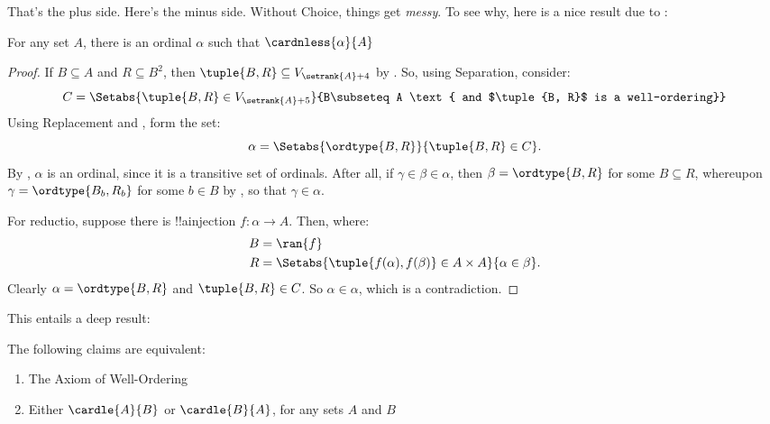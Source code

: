 \documentclass[../../../include/open-logic-section]{subfiles}
\begin{document}

That's the plus side. Here's the minus side. Without Choice, things
get \emph{messy}. To see why, here is a nice result due to
\cite{Hartogs1915}:

\begin{lem}[\emph{in $\ZF$}]
For any set $A$, there is an ordinal $\alpha$ such that $\cardnless{\alpha}{A}$
\end{lem}

\begin{proof}
If $B \subseteq A$ and $R \subseteq B^2$, then $\tuple{B, R} \subseteq
V_{\setrank{A}+4}$ by
. So, using
Separation, consider:
\[
	C = \Setabs{\tuple{B, R} \in V_{\setrank{A}+5}}{B\subseteq A 
	\text{ and $\tuple{B, R}$ is a well-ordering}}
\]
Using Replacement and
, form the set: 
\[
	\alpha = \Setabs{\ordtype{B, R}}{\tuple{B, R} \in C}.
\]
By , $\alpha$ is an
ordinal, since it is a transitive set of ordinals. After all, if
$\gamma \in \beta \in \alpha$, then $\beta = \ordtype{B, R}$ for some
$B \subseteq R$, whereupon $\gamma = \ordtype{B_b, R_b}$ for some $b
\in B$ by , so that
$\gamma \in \alpha$. 

For reductio, suppose there is !!a{injection} $f \colon \alpha \to A$.
Then, where:
\begin{align*}
	B &= \ran{f}\\
	R &= \Setabs{\tuple{f(\alpha), f(\beta)} \in A \times A}{\alpha \in \beta}.
\end{align*}
Clearly $\alpha = \ordtype{B, R}$ and $\tuple{B, R} \in C$. So $\alpha
\in \alpha$, which is a contradiction.
\end{proof}

This entails a deep result:

\begin{thm}[\emph{in $\ZF$}]
The following claims are equivalent:
\begin{enumerate}
	\item{} The Axiom of Well-Ordering
	\item{} Either $\cardle{A}{B}$ or
	$\cardle{B}{A}$, for any sets $A$ and $B$
\end{enumerate}
\end{thm}
\end{document}
